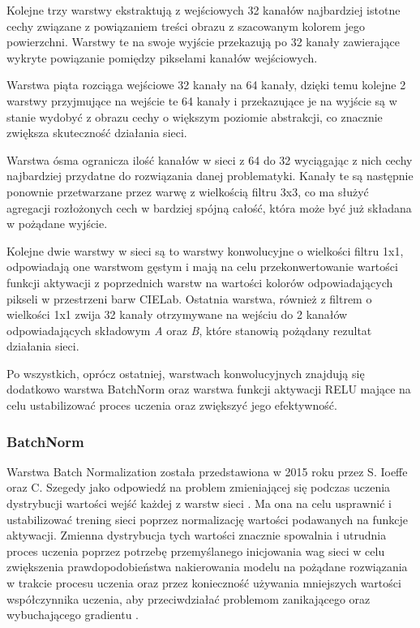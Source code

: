   Kolejne trzy warstwy ekstraktują z wejściowych 32 kanałów najbardziej istotne
  cechy związane z powiązaniem treści obrazu z szacowanym kolorem jego powierzchni.
  Warstwy te na swoje wyjście przekazują po 32 kanały zawierające wykryte
  powiązanie pomiędzy pikselami kanałów wejściowych.

  Warstwa piąta rozciąga wejściowe 32 kanały na 64 kanały, dzięki temu kolejne
  2 warstwy przyjmujące na wejście te 64 kanały i przekazujące je na wyjście są
  w stanie wydobyć z obrazu cechy o większym poziomie abstrakcji, co znacznie
  zwiększa skuteczność działania sieci.

  Warstwa ósma ogranicza ilość kanałów w sieci z 64 do 32 wyciągając z nich
  cechy najbardziej przydatne do rozwiązania danej problematyki. Kanały te są
  następnie ponownie przetwarzane przez warwę z wielkością filtru 3x3, co ma
  służyć agregacji rozłożonych cech w bardziej spójną całość, która może być
  już składana w pożądane wyjście.

  Kolejne dwie warstwy w sieci są to warstwy konwolucyjne o wielkości filtru 1x1,
  odpowiadają one warstwom gęstym i mają na celu przekonwertowanie wartości
  funkcji aktywacji z poprzednich warstw na wartości kolorów odpowiadających
  pikseli w przestrzeni barw CIELab. Ostatnia warstwa, również z filtrem o
  wielkości 1x1 zwija 32 kanały otrzymywane na wejściu do 2 kanałów odpowiadających
  składowym \textit{A} oraz \textit{B}, które stanowią pożądany rezultat działania
  sieci.

  Po wszystkich, oprócz ostatniej, warstwach konwolucyjnych znajdują się dodatkowo
  warstwa BatchNorm oraz warstwa funkcji aktywacji RELU mające na celu
  ustabilizować proces uczenia oraz zwiększyć jego efektywność.

  \subsubsection{BatchNorm}

  Warstwa Batch Normalization została przedstawiona w 2015 roku przez S. Ioeffe
  oraz C. Szegedy jako odpowiedź
  na problem zmieniającej się podczas uczenia dystrybucji wartości wejść
  każdej z warstw sieci \cite{BatchNorm}. Ma ona na celu usprawnić i ustabilizować
  trening sieci poprzez normalizację wartości podawanych na funkcje aktywacji.
  Zmienna dystrybucja tych wartości znacznie spowalnia i utrudnia proces uczenia
  poprzez potrzebę przemyślanego inicjowania
  wag sieci w celu zwiększenia prawdopodobieństwa nakierowania modelu na pożądane
  rozwiązania w trakcie procesu uczenia oraz przez
  konieczność używania mniejszych wartości współczynnika uczenia, aby
  przeciwdziałać problemom zanikającego oraz wybuchającego gradientu
  \cite{exploding_vanishing_grad}.

